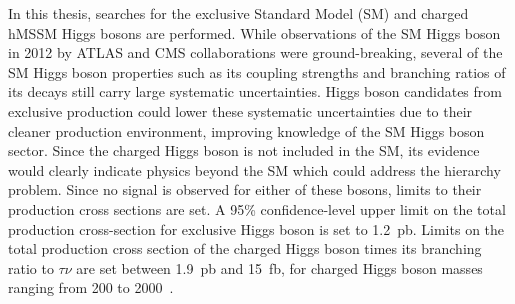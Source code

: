 In this thesis, searches for the exclusive Standard Model (SM) and charged hMSSM Higgs bosons are performed. 
While observations of the SM Higgs boson in 2012 by ATLAS and CMS collaborations 
were ground-breaking, several of the SM Higgs boson properties such as its coupling strengths and branching ratios 
of its decays still carry large systematic uncertainties. Higgs boson candidates from exclusive production 
could lower these systematic uncertainties due to their cleaner production environment, 
improving knowledge of the SM Higgs boson sector.
Since the charged Higgs boson is not included in the SM, its evidence 
would clearly indicate physics beyond the SM which could address the hierarchy 
problem.
Since no signal is observed for either of these bosons, limits to their production cross sections 
are set. A 95\% confidence-level upper limit on the total production cross-section for exclusive 
Higgs boson is set to 1.2~pb. Limits on the total production 
cross section of the charged Higgs boson times its branching ratio to $\tau\nu$ 
are set between 1.9~pb and 15~fb, for charged Higgs boson masses ranging from 200 to 2000~\GeV.   
